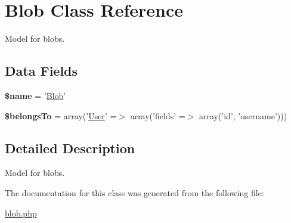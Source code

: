 \hypertarget{class_blob}{
\section{Blob Class Reference}
\label{class_blob}
}


Model for blobs.  


\subsection*{Data Fields}
\begin{DoxyCompactItemize}
\item 
\hypertarget{class_blob_ab2fc40d43824ea3e1ce5d86dee0d763b}{
{\bfseries \$name} = '\hyperlink{class_blob}{Blob}'}
\label{class_blob_ab2fc40d43824ea3e1ce5d86dee0d763b}

\item 
\hypertarget{class_blob_a1578683643768f402aa354aabf0c1c31}{
{\bfseries \$belongsTo} = array('\hyperlink{class_user}{User}' =$>$ array('fields' =$>$ array('id', 'username')))}
\label{class_blob_a1578683643768f402aa354aabf0c1c31}

\end{DoxyCompactItemize}


\subsection{Detailed Description}
Model for blobs. 

The documentation for this class was generated from the following file:\begin{DoxyCompactItemize}
\item 
\hyperlink{blob_8php}{blob.php}\end{DoxyCompactItemize}
